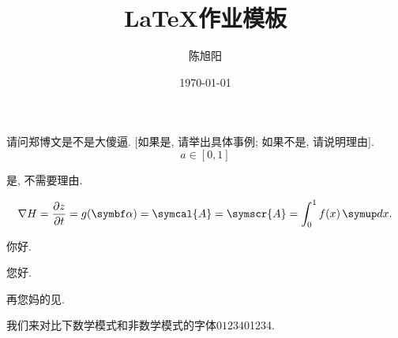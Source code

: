 \documentclass[chinese]{assignment}[2019/10/15]
\title{\LaTeX 作业模板}
\author{陈旭阳}
\date{\today}
\institute{同济大学数学科学学院}
\begin{document}
    \maketitle

    \begin{problem}
        请问郑博文是不是大傻逼. [如果是, 请举出具体事例; 如果不是, 请说明理由].
        \begin{equation}
            a\in[0, 1]
        \end{equation}
    \end{problem}

    \begin{solution}
        是, 不需要理由.

        \begin{equation}
            \nabla{H}=\frac{\partial{z}}{\partial{t}}=g(\vect{\alpha}) = \symcal{A} = \symscr{A} = \int_{0}^{1}f(x)\diff x.
        \end{equation}

        你好.


    \end{solution}

    \clearpage

    您好.

    \begin{problem}
        再您妈的见.
    \end{problem}

    我们来对比下数学模式和非数学模式的字体$01234$01234.
\end{document}
